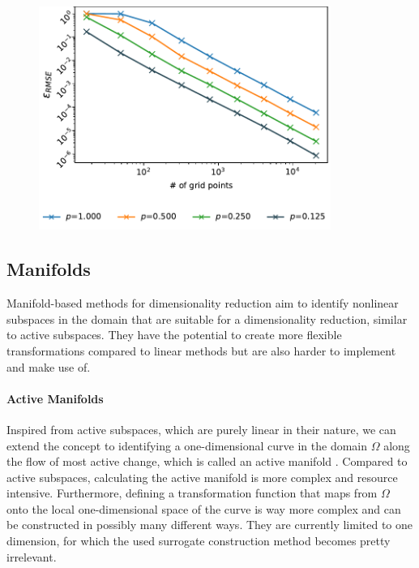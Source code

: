 \documentclass[
  a4paper,  %
  twoside,  %
  bibliography=totoc,
  headsepline,
  cleardoublepage=empty,
  parskip=half,
  draft=false
]{scrbook}
\begin{document}
\begin{mdframed}[style=style]
\vspace{2mm}
\begin{figure}[H]
        \centering
\begin{minipage}{.35\textwidth}
        \centering
\label{fig:periodic}
    \end{minipage}%
    \begin{minipage}{0.65\textwidth}
        \centering
\includegraphics[width=0.85\textwidth]{graphics/periodic}
    \end{minipage}
\end{figure}
\end{mdframed}

\subsection{Manifolds}

Manifold-based methods for dimensionality reduction aim to identify nonlinear subspaces in the domain that are suitable for a dimensionality reduction, similar to active subspaces.
They have the potential to create more flexible transformations compared to linear methods but are also harder to implement and make use of.

\paragraph{Active Manifolds}
Inspired from active subspaces, which are purely linear in their nature, we can extend the concept to identifying a one-dimensional curve in the domain $\Omega$ along the flow of most active change, which is called an active manifold \cite{Bridges2019}.
Compared to active subspaces, calculating the active manifold is more complex and resource intensive.
Furthermore, defining a transformation function that maps from $\Omega$ onto the local one-dimensional space of the curve is way more complex and can be constructed in possibly many different ways.
They are currently limited to one dimension, for which the used surrogate construction method becomes pretty irrelevant.
\end{document}
